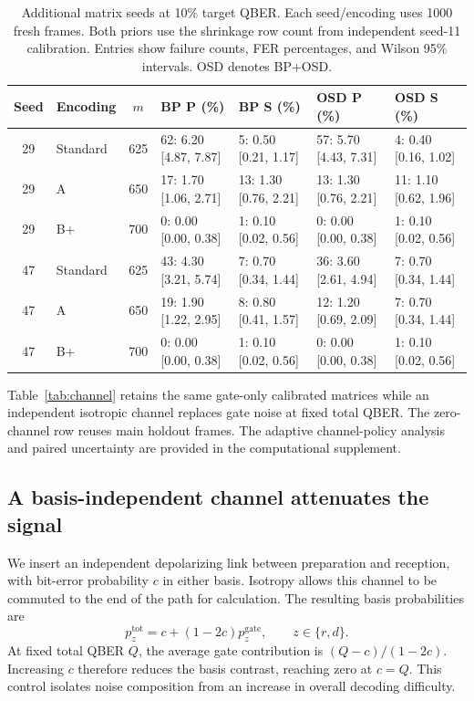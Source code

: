 \begin{table}[htbp]
\centering
\small\setlength{\tabcolsep}{3.2pt}
\caption{Additional matrix seeds at 10\% target QBER. Each seed/encoding uses 1000 fresh frames. Both priors use the shrinkage row count from independent seed-11 calibration. Entries show failure counts, FER percentages, and Wilson 95\% intervals. OSD denotes BP+OSD.}
\label{tab:replication}
\begin{tabular}{@{}clcllll@{}}
\toprule
Seed & Encoding & $m$ & BP P (\%) & BP S (\%) & OSD P (\%) & OSD S (\%) \\
\midrule
29 & Standard & 625 & 62: 6.20 [4.87, 7.87] & 5: 0.50 [0.21, 1.17] & 57: 5.70 [4.43, 7.31] & 4: 0.40 [0.16, 1.02] \\
29 & A & 650 & 17: 1.70 [1.06, 2.71] & 13: 1.30 [0.76, 2.21] & 13: 1.30 [0.76, 2.21] & 11: 1.10 [0.62, 1.96] \\
29 & B+ & 700 & 0: 0.00 [0.00, 0.38] & 1: 0.10 [0.02, 0.56] & 0: 0.00 [0.00, 0.38] & 1: 0.10 [0.02, 0.56] \\
47 & Standard & 625 & 43: 4.30 [3.21, 5.74] & 7: 0.70 [0.34, 1.44] & 36: 3.60 [2.61, 4.94] & 7: 0.70 [0.34, 1.44] \\
47 & A & 650 & 19: 1.90 [1.22, 2.95] & 8: 0.80 [0.41, 1.57] & 12: 1.20 [0.69, 2.09] & 7: 0.70 [0.34, 1.44] \\
47 & B+ & 700 & 0: 0.00 [0.00, 0.38] & 1: 0.10 [0.02, 0.56] & 0: 0.00 [0.00, 0.38] & 1: 0.10 [0.02, 0.56] \\
\bottomrule
\end{tabular}
\end{table}



\FloatBarrier
Table~\ref{tab:channel} retains the same gate-only calibrated matrices while an independent
isotropic channel replaces gate noise at fixed total QBER. The zero-channel row reuses
main holdout frames. The adaptive channel-policy analysis and paired uncertainty are
provided in the computational supplement.

\subsection{A basis-independent channel attenuates the signal}
We insert an independent depolarizing link between preparation and reception, with bit-error
probability $c$ in either basis. Isotropy allows this channel to be commuted to the end of
the path for calculation. The resulting basis probabilities are
\begin{equation}
 p_z^{\mathrm{tot}}=c+(1-2c)p_z^{\mathrm{gate}},\qquad z\in\{r,d\}.
 \label{eq:channel}
\end{equation}
At fixed total QBER $Q$, the average gate contribution is $(Q-c)/(1-2c)$. Increasing $c$
therefore reduces the basis contrast, reaching zero at $c=Q$. This control isolates noise
composition from an increase in overall decoding difficulty.

